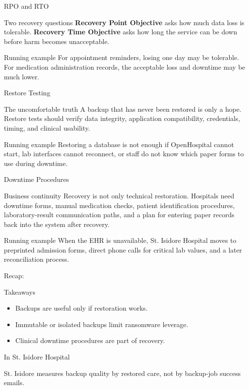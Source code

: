 \documentclass[presentation]{beamer}
\newcommand{\scenario}{St. Isidore Hospital}
\newcommand{\takeawaysframe}[2]{
\begin{frame}[c]{Recap: \insertsection}
\begin{block}{Takeaways}
#1
\end{block}
\begin{exampleblock}{In \scenario}
#2
\end{exampleblock}
\end{frame}
}
\begin{document}
\begin{frame}[c]{RPO and RTO}
\begin{block}{Two recovery questions}
\textbf{Recovery Point Objective} asks how much data loss is tolerable. \textbf{Recovery Time
Objective} asks how long the service can be down before harm becomes unacceptable.
\end{block}

\begin{exampleblock}{Running example}
For appointment reminders, losing one day may be tolerable. For medication administration records,
the acceptable loss and downtime may be much lower.
\end{exampleblock}
\end{frame}

\begin{frame}[c]{Restore Testing}
\begin{block}{The uncomfortable truth}
A backup that has never been restored is only a hope. Restore tests should verify data integrity,
application compatibility, credentials, timing, and clinical usability.
\end{block}

\begin{exampleblock}{Running example}
Restoring a database is not enough if OpenHospital cannot start, lab interfaces cannot reconnect,
or staff do not know which paper forms to use during downtime.
\end{exampleblock}
\end{frame}

\begin{frame}[c]{Downtime Procedures}
\begin{block}{Business continuity}
Recovery is not only technical restoration. Hospitals need downtime forms, manual medication checks,
patient identification procedures, laboratory-result communication paths, and a plan for entering
paper records back into the system after recovery.
\end{block}

\begin{exampleblock}{Running example}
When the EHR is unavailable, \scenario{} moves to preprinted admission forms, direct phone calls for
critical lab values, and a later reconciliation process.
\end{exampleblock}
\end{frame}

\takeawaysframe{
\begin{itemize}
    \item Backups are useful only if restoration works.
    \item Immutable or isolated backups limit ransomware leverage.
    \item Clinical downtime procedures are part of recovery.
\end{itemize}
}{
St. Isidore measures backup quality by restored care, not by backup-job success emails.
}
\end{document}
